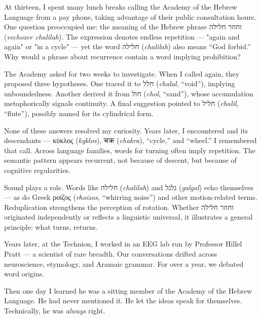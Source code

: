 \begin{commentary}
At thirteen, I spent many lunch breaks calling the Academy of the Hebrew Language from a pay phone, taking advantage of their public consultation hours. One question preoccupied me: the meaning of the Hebrew phrase \texthebrew{וחוזר חלילה} (\emph{vechozer chalilah}). The expression denotes endless repetition — "again and again" or "in a cycle" — yet the word \texthebrew{חלילה} (\emph{chalilah}) also means “God forbid.” Why would a phrase about recurrence contain a word implying prohibition?

The Academy asked for two weeks to investigate. When I called again, they proposed three hypotheses. One traced it to \texthebrew{חלל} (\emph{chalal}, “void”), implying unboundedness. Another derived it from \texthebrew{חול} (\emph{chol}, “sand”), whose accumulation metaphorically signals continuity. A final suggestion pointed to \texthebrew{חליל} (\emph{chalil}, “flute”), possibly named for its cylindrical form.

None of these answers resolved my curiosity. Years later, I encountered  and its descendants — \textgreek{κύκλος} (\emph{kyklos}), \textsanskrit{चक्र} (\emph{chakra}), “cycle,” and “wheel.” I remembered that call. Across language families, words for turning often imply repetition. The semantic pattern appears recurrent, not because of descent, but because of cognitive regularities.

Sound plays a role. Words like \texthebrew{חלילה} (\emph{chalilah}) and \texthebrew{גלגל} (\emph{galgal}) echo themselves — as do Greek \textgreek{ροίζος} (\emph{rhoizos}, “whirring noise”) and other motion-related terms. Reduplication strengthens the perception of rotation. Whether \texthebrew{וחוזר חלילה} originated independently or reflects a linguistic universal, it illustrates a general principle: what turns, returns.

Years later, at the Technion, I worked in an EEG lab run by Professor Hillel Pratt — a scientist of rare breadth. Our conversations drifted across neuroscience, etymology, and Aramaic grammar. For over a year, we debated word origins.

Then one day I learned he was a sitting member of the Academy of the Hebrew Language. He had never mentioned it. He let the ideas speak for themselves. Technically, he was \textit{always} right.
\end{commentary}


